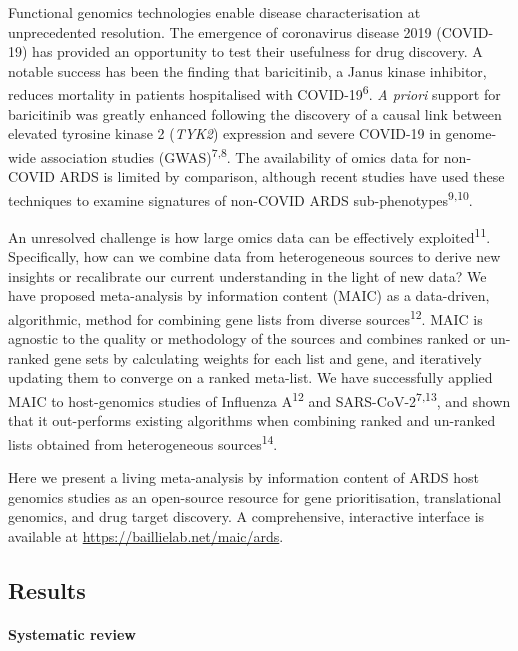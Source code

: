 \documentclass[
  11,
  a4paper,
]{article}
\let\oldparagraph\paragraph
\renewcommand{\paragraph}[1]{\oldparagraph{#1}\mbox{}}
\begin{document}
Functional genomics technologies enable disease characterisation at
unprecedented resolution. The emergence of coronavirus disease 2019
(COVID-19) has provided an opportunity to test their usefulness for drug
discovery. A notable success has been the finding that baricitinib, a
Janus kinase inhibitor, reduces mortality in patients hospitalised with
COVID-19\textsuperscript{6}. \emph{A priori} support for baricitinib was
greatly enhanced following the discovery of a causal link between
elevated tyrosine kinase 2 (\emph{TYK2}) expression and severe COVID-19
in genome-wide association studies (GWAS)\textsuperscript{7,8}. The
availability of omics data for non-COVID ARDS is limited by comparison,
although recent studies have used these techniques to examine signatures
of non-COVID ARDS sub-phenotypes\textsuperscript{9,10}.

An unresolved challenge is how large omics data can be effectively
exploited\textsuperscript{11}. Specifically, how can we combine data
from heterogeneous sources to derive new insights or recalibrate our
current understanding in the light of new data? We have proposed
meta-analysis by information content (MAIC) as a data-driven,
algorithmic, method for combining gene lists from diverse
sources\textsuperscript{12}. MAIC is agnostic to the quality or
methodology of the sources and combines ranked or un-ranked gene sets by
calculating weights for each list and gene, and iteratively updating
them to converge on a ranked meta-list. We have successfully applied
MAIC to host-genomics studies of Influenza A\textsuperscript{12} and
SARS-CoV-2\textsuperscript{7,13}, and shown that it out-performs
existing algorithms when combining ranked and un-ranked lists obtained
from heterogeneous sources\textsuperscript{14}.

Here we present a living meta-analysis by information content of ARDS
host genomics studies as an open-source resource for gene
prioritisation, translational genomics, and drug target discovery. A
comprehensive, interactive interface is available at
\url{https://baillielab.net/maic/ards}.

\newpage

\hypertarget{results}{%
\subsection{Results}\label{results}}

\hypertarget{systematic-review}{%
\paragraph{Systematic review}\label{systematic-review}}
\end{document}
